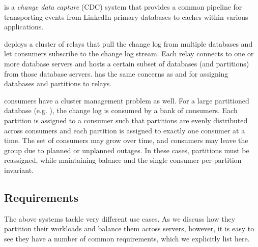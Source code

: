 \subheader{\databus}
\databus is a \emph{change data capture} (CDC) system that provides a common pipeline 
for transporting events from LinkedIn primary databases to caches within various applications. 

\databus deploys a cluster of relays that pull the change log from multiple databases and let consumers subscribe to the 
change log stream.  Each \databus relay connects to one or more database servers
and hosts a certain subset of databases (and partitions) from those database servers. 
\databus has the same concerns as \ES and \seas for assigning databases and
partitions to relays.

\databus consumers have a cluster management problem as well.  For a
large partitioned database (e.g. \ES), the change log is consumed by a bank of
consumers.  Each \databus partition is assigned to a consumer such that
partitions are evenly distributed across consumers and each partition is
assigned to exactly one consumer at a time. The set of consumers may grow over
time, and consumers may leave the group due to planned or unplanned outages.  In 
these cases, partitions must be reassigned, while maintaining balance and the
single consumer-per-partition invariant. 

\subsection{Requirements}
\label{sec:requirements}
%
The above systems tackle very different use cases.  As we discuss how they
partition their workloads and balance them across servers, however, it is easy
to see they have a number of common requirements, which we explicitly list here.


